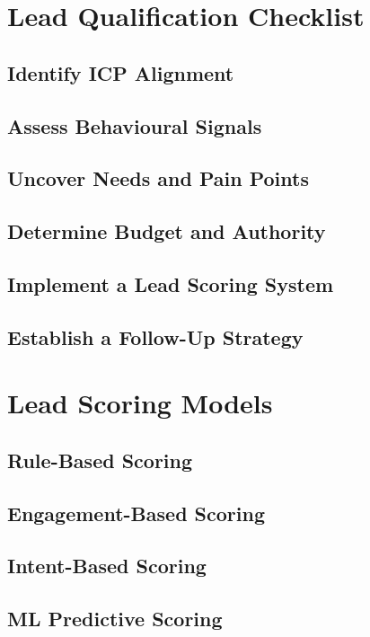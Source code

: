 \section{Lead Qualification Checklist}\mbox{}
    \subsection{Identify ICP Alignment}\mbox{}
    \subsection{Assess Behavioural Signals}\mbox{}
    \subsection{Uncover Needs and Pain Points}\mbox{}
    \subsection{Determine Budget and Authority}\mbox{}
    \subsection{Implement a Lead Scoring System}\mbox{}
    \subsection{Establish a Follow-Up Strategy}\mbox{}

\section{Lead Scoring Models}\mbox{}
    \subsection{Rule-Based Scoring}\mbox{}
    \subsection{Engagement-Based Scoring}\mbox{}
    \subsection{Intent-Based Scoring}\mbox{}
    \subsection{ML Predictive Scoring}\mbox{}
